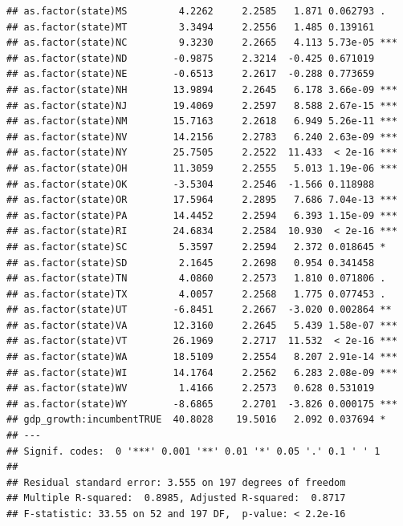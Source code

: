 \documentclass[
]{article}
\begin{document}
\begin{verbatim}
## as.factor(state)MS         4.2262     2.2585   1.871 0.062793 .  
## as.factor(state)MT         3.3494     2.2556   1.485 0.139161    
## as.factor(state)NC         9.3230     2.2665   4.113 5.73e-05 ***
## as.factor(state)ND        -0.9875     2.3214  -0.425 0.671019    
## as.factor(state)NE        -0.6513     2.2617  -0.288 0.773659    
## as.factor(state)NH        13.9894     2.2645   6.178 3.66e-09 ***
## as.factor(state)NJ        19.4069     2.2597   8.588 2.67e-15 ***
## as.factor(state)NM        15.7163     2.2618   6.949 5.26e-11 ***
## as.factor(state)NV        14.2156     2.2783   6.240 2.63e-09 ***
## as.factor(state)NY        25.7505     2.2522  11.433  < 2e-16 ***
## as.factor(state)OH        11.3059     2.2555   5.013 1.19e-06 ***
## as.factor(state)OK        -3.5304     2.2546  -1.566 0.118988    
## as.factor(state)OR        17.5964     2.2895   7.686 7.04e-13 ***
## as.factor(state)PA        14.4452     2.2594   6.393 1.15e-09 ***
## as.factor(state)RI        24.6834     2.2584  10.930  < 2e-16 ***
## as.factor(state)SC         5.3597     2.2594   2.372 0.018645 *  
## as.factor(state)SD         2.1645     2.2698   0.954 0.341458    
## as.factor(state)TN         4.0860     2.2573   1.810 0.071806 .  
## as.factor(state)TX         4.0057     2.2568   1.775 0.077453 .  
## as.factor(state)UT        -6.8451     2.2667  -3.020 0.002864 ** 
## as.factor(state)VA        12.3160     2.2645   5.439 1.58e-07 ***
## as.factor(state)VT        26.1969     2.2717  11.532  < 2e-16 ***
## as.factor(state)WA        18.5109     2.2554   8.207 2.91e-14 ***
## as.factor(state)WI        14.1764     2.2562   6.283 2.08e-09 ***
## as.factor(state)WV         1.4166     2.2573   0.628 0.531019    
## as.factor(state)WY        -8.6865     2.2701  -3.826 0.000175 ***
## gdp_growth:incumbentTRUE  40.8028    19.5016   2.092 0.037694 *  
## ---
## Signif. codes:  0 '***' 0.001 '**' 0.01 '*' 0.05 '.' 0.1 ' ' 1
## 
## Residual standard error: 3.555 on 197 degrees of freedom
## Multiple R-squared:  0.8985, Adjusted R-squared:  0.8717 
## F-statistic: 33.55 on 52 and 197 DF,  p-value: < 2.2e-16
\end{verbatim}
\end{document}
